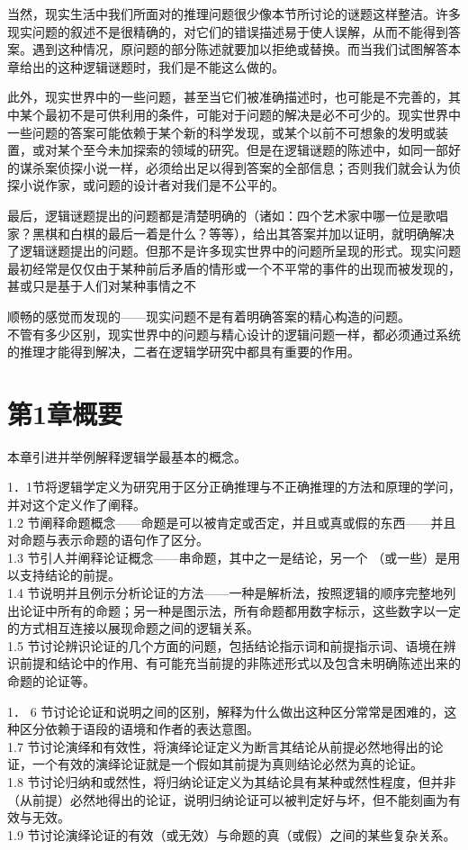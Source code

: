 当然，现实生活中我们所面对的推理问题很少像本节所讨论的谜题这样整洁。许多现实问题的叙述不是很精确的，对它们的错误描述易于使人误解，从而不能得到答案。遇到这种情况，原问题的部分陈述就要加以拒绝或替换。而当我们试图解答本章给出的这种逻辑谜题时，我们是不能这么做的。

此外，现实世界中的一些问题，甚至当它们被准确描述时，也可能是不完善的，其中某个最初不是可供利用的条件，可能对于问题的解决是必不可少的。现实世界中一些问题的答案可能依赖于某个新的科学发现，或某个以前不可想象的发明或装置，或对某个至今未加探索的领域的研究。但是在逻辑谜题的陈述中，如同一部好的谋杀案侦探小说一样，必须给出足以得到答案的全部信息；否则我们就会认为侦探小说作家，或问题的设计者对我们是不公平的。

最后，逻辑谜题提出的问题都是清楚明确的（诸如：四个艺术家中哪一位是歌唱家？黑棋和白棋的最后一着是什么？等等），给出其答案并加以证明，就明确解决了逻辑谜题提出的问题。但那不是许多现实世界中的问题所呈现的形式。现实问题最初经常是仅仅由于某种前后矛盾的情形或一个不平常的事件的出现而被发现的，甚或只是基于人们对某种事情之不

顺畅的感觉而发现的——现实问题不是有着明确答案的精心构造的问题。\\
不管有多少区别，现实世界中的问题与精心设计的逻辑问题一样，都必须通过系统的推理才能得到解决，二者在逻辑学研究中都具有重要的作用。

\section*{第1章概要}
本章引进并举例解释逻辑学最基本的概念。

1．1节将逻辑学定义为研究用于区分正确推理与不正确推理的方法和原理的学问，并对这个定义作了阐释。\\
1.2 节阐释命题概念——命题是可以被肯定或否定，并且或真或假的东西——并且对命题与表示命题的语句作了区分。\\
1.3 节引人并阐释论证概念——串命题，其中之一是结论，另一个 （或一些）是用以支持结论的前提。\\
1.4 节说明并且例示分析论证的方法——一种是解析法，按照逻辑的顺序完整地列出论证中所有的命题；另一种是图示法，所有命题都用数字标示，这些数字以一定的方式相互连接以展现命题之间的逻辑关系。\\
1.5 节讨论辨识论证的几个方面的问题，包括结论指示词和前提指示词、语境在辨识前提和结论中的作用、有可能充当前提的非陈述形式以及包含未明确陈述出来的命题的论证等。

1． 6 节讨论论证和说明之间的区别，解释为什么做出这种区分常常是困难的，这种区分依赖于语段的语境和作者的表达意图。\\
1.7 节讨论演绎和有效性，将演绎论证定义为断言其结论从前提必然地得出的论证，一个有效的演绎论证就是一个假如其前提为真则结论必然为真的论证。\\
1.8 节讨论归纳和或然性，将归纳论证定义为其结论具有某种或然性程度，但并非（从前提）必然地得出的论证，说明归纳论证可以被判定好与坏，但不能刻画为有效与无效。\\
1.9 节讨论演绎论证的有效（或无效）与命题的真（或假）之间的某些复杂关系。

